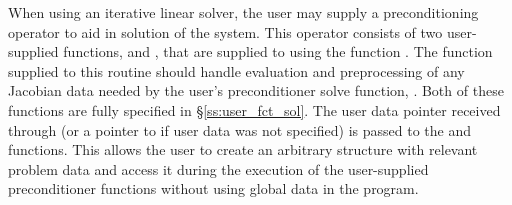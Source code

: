 When using an iterative linear solver, the user may supply a
preconditioning operator to aid in solution of the system.  This
operator consists of two user-supplied functions,  and
, that are supplied to {\kinls} using the function
.  The  function supplied to
this routine should handle evaluation and preprocessing of any
Jacobian data needed by the user's preconditioner solve function,
.  Both of these functions are fully specified in
\S\ref{ss:user_fct_sol}.  The user data pointer received through
 (or a pointer to  if user data was not
specified) is passed to the  and  functions.
This allows the user to create an arbitrary structure with relevant
problem data and access it during the execution of the user-supplied
preconditioner functions without using global data in the program.


